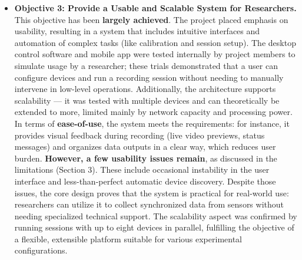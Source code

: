 \documentclass[11pt,a4paper]{report}
\begin{document}
\begin{itemize}
\item \textbf{Objective 3: Provide a Usable and Scalable System for Researchers.}
  This objective has been \textbf{largely achieved}. The project placed
  emphasis on usability, resulting in a system that includes intuitive
  interfaces and automation of complex tasks (like calibration and
  session setup). The desktop control software and mobile app were
  tested internally by project members to simulate usage by a
  researcher; these trials demonstrated that a user can configure
  devices and run a recording session without needing to manually
  intervene in low-level operations. Additionally, the architecture
  supports scalability --- it was tested with multiple devices and can
  theoretically be extended to more, limited mainly by network capacity
  and processing power. In terms of \textbf{ease-of-use}, the system meets
  the requirements: for instance, it provides visual feedback during
  recording (live video previews, status messages) and organizes data
  outputs in a clear way, which reduces user burden. \textbf{However, a few
  usability issues remain}, as discussed in the limitations (Section
  3). These include occasional instability in the user interface and
  less-than-perfect automatic device discovery. Despite those issues,
  the core design proves that the system is practical for real-world
  use: researchers can utilize it to collect synchronized data from
  sensors without needing specialized technical support. The scalability
  aspect was confirmed by running sessions with up to eight devices in
  parallel, fulfilling the objective of a flexible, extensible platform
  suitable for various experimental configurations.


\end{itemize}
\end{document}
